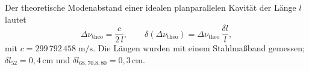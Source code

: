 Der theoretische Modenabstand einer idealen planparallelen Kavität der Länge $l$ lautet
\begin{equation}
  \Delta\nu_{\mathrm{theo}} = \frac{c}{2\,l}, 
  \qquad
  \delta(\Delta\nu_{\mathrm{theo}}) = \Delta\nu_{\mathrm{theo}}\,\frac{\delta l}{l},
\end{equation}
mit $c = 299\,792\,458\;\mathrm{m/s}$. Die Längen wurden mit einem Stahlmaßband gemessen; $\delta l_{52} = 0{,}4\,\mathrm{cm}$ und $\delta l_{68,70.8,80} = 0{,}3\,\mathrm{cm}$.

\begin{table}[H]
  \centering
  \caption{Beats von $m=1$ und $m=2$ Moden: experimentelle und theoretische Modenabstände für verschiedene interne Kavitätenlängen.}
  \label{tab:beat-data}
\end{table}


